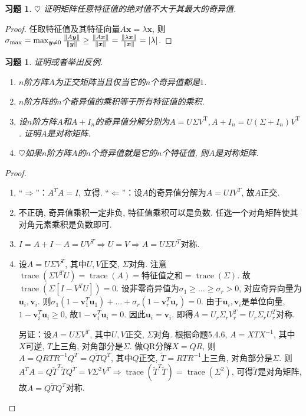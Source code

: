 \documentclass{ctexart}
\newtheorem{exercise}[thm]{习题}
\newcommand\bs[1]{\boldsymbol{ #1}}
\def\hard{$\heartsuit$}
\def\wtd{\widetilde}
\DeclareMathOperator{\T}{T}
\DeclareMathOperator{\trace}{trace}
\DeclarePairedDelimiter\abs{|}{|}
\DeclarePairedDelimiter\N{\|}{\|}
\begin{document}
\begin{exercise} \hard
证明矩阵任意特征值的绝对值不大于其最大的奇异值. 
\end{exercise}
\begin{proof}
	任取特征值及其特征向量$A\bs x=\lambda\bs x$, 则$\sigma_{\max}=\max_{\bs y\ne 0}\frac{\N{A\bs y}}{\N{\bs y}}\ge \frac{\N{A\bs x}}{\N{\bs x}}= \frac{\N{\lambda\bs x}}{\N{\bs x}}=\abs{\lambda}$. 
\end{proof}

\begin{exercise}
证明或者举出反例. 
\begin{enumerate}
\item $n$阶方阵$A$为正交矩阵当且仅当它的$n$个奇异值都是$1$. 
\item $n$阶方阵的$n$个奇异值的乘积等于所有特征值的乘积. 
\item 设$n$阶方阵$A$和$A+I_n$的奇异值分解分别为$A=U\Sigma V^{\T},A+I_n=U(\Sigma+I_n)V^{\T}$. 
证明$A$是对称矩阵. 
\item \hard 如果$n$阶方阵$A$的$n$个奇异值就是它的$n$个特征值, 则$A$是对称矩阵. 
\end{enumerate}
\end{exercise}
\begin{proof}
	\begin{enumerate}
		\item ``$\Rightarrow$''：$A^TA=I$, 立得. 
			``$\Leftarrow$''：设$A$的奇异值分解为$A=UIV^T$, 故$A$正交. 
		\item 不正确, 奇异值乘积一定非负, 特征值乘积可以是负数. 任选一个对角矩阵使其对角元素乘积是负数即可. 
			\item $I=A+I-A=UV^T\Rightarrow U=V\Rightarrow A=U\Sigma U^T$对称. 
			\item 
				设$A=U\Sigma V^T$, 其中$U,V$正交, $\Sigma$对角. 
				注意$\trace(\Sigma V^TU)=\trace(A)=\text{特征值之和}=\trace(\Sigma)$. 
				故$\trace(\Sigma[I-V^TU])=0$. 
				设非零奇异值为$\sigma_1\ge\dots\ge\sigma_r>0$, 对应奇异向量为$\bs u_i,\bs v_i$. 则$\sigma_1(1-\bs v_1^T\bs u_1)+\dots+\sigma_r(1-\bs v_r^T\bs u_r)=0$. 
				由于$\bs u_i,\bs v_i$是单位向量, $1-\bs v_i^T\bs u_i\ge 0$, 故$1-\bs v_i^T\bs u_i=0$. 
				因此$\bs u_i=\bs v_i$. 即得$A=U_r\Sigma_rV_r^T=U_r\Sigma_rU_r^T$对称. 

				另证：设$A=U\Sigma V^T$, 其中$U,V$正交, $\Sigma$对角. 根据命题5.4.6, $A=XTX^{-1}$, 其中$X$可逆, $T$上三角, 对角部分是$\Sigma$. 
				做QR分解$X=QR$, 则$A=QRTR^{-1}Q^T=Q\wtd TQ^T$, 其中$Q$正交, $\wtd T=RTR^{-1}$上三角, 对角部分是$\Sigma$. 
				则$A^TA=Q\wtd T^T\wtd TQ^T=V\Sigma^2V^T\Rightarrow \trace(\wtd T^T\wtd T)=\trace(\Sigma^2)$, 可得$\wtd T$是对角矩阵, 故$A=Q\wtd TQ^T$对称. 
	\end{enumerate}
\end{proof}
\end{document}
